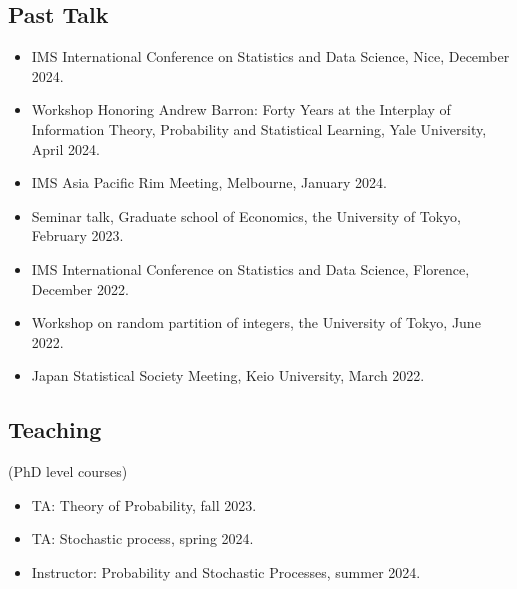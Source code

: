 \documentclass[10pt]{amsart}
\begin{document}
\subsection*{Past Talk}
\begin{itemize}
  \item  IMS International Conference on Statistics and Data Science, Nice, December 2024. 
  \item  Workshop Honoring Andrew Barron: Forty Years at the Interplay of Information Theory, Probability and Statistical Learning, Yale University, April 2024. 
  \item IMS Asia Pacific Rim Meeting, Melbourne, January 2024. 
  \item Seminar talk, Graduate school of Economics, the University of Tokyo, February 2023. 
  \item IMS International Conference on Statistics and Data Science, Florence, December 2022.
  \item  Workshop on random partition of integers, the University of Tokyo, June 2022.
  \item Japan Statistical Society Meeting, Keio University, March 2022.
\end{itemize}
\subsection*{Teaching} (PhD level courses)
\begin{itemize}
\item TA: Theory of Probability, fall 2023.
\item TA: Stochastic process, spring 2024.
\item Instructor: Probability and Stochastic Processes, summer 2024.
\end{itemize}
\end{document}
